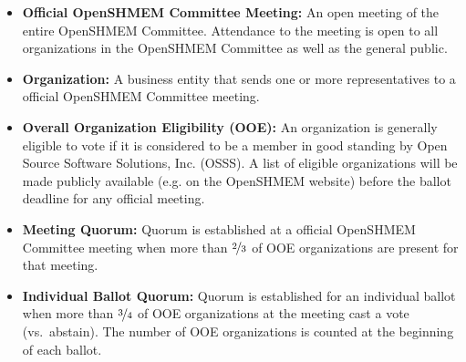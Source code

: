 \begin{itemize}
\item {\bf Official OpenSHMEM Committee Meeting:} An open meeting of the entire
  OpenSHMEM Committee.  Attendance to the meeting is open to
  all organizations in the OpenSHMEM Committee as well as the general public.

\item {\bf Organization:} A business entity that sends one or more
  representatives to a official OpenSHMEM Committee meeting.

\item {\bf Overall Organization Eligibility (OOE):} An organization is
  generally eligible to vote if it is considered to be a member in good
  standing by Open Source Software Solutions, Inc. (OSSS).  A list of eligible
  organizations will be made publicly available (e.g. on the OpenSHMEM website)
  before the ballot deadline for any official meeting.

\item {\bf Meeting Quorum:} Quorum is established at a official OpenSHMEM
  Committee meeting when more than $\nicefrac{2}{3}$ of OOE organizations
  are present for that meeting.

\item {\bf Individual Ballot Quorum:} Quorum is established for an
  individual ballot when more than $\nicefrac{3}{4}$ of OOE
  organizations at the meeting cast a vote (vs.\ abstain).  The number
  of OOE organizations is counted at the beginning of each ballot.
\end{itemize}
